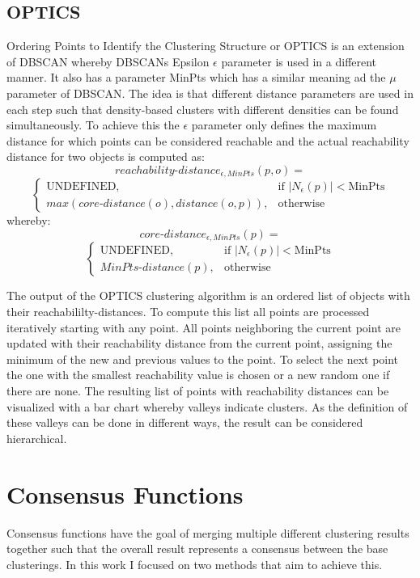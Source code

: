 \documentclass[
	a4paper,
	english,
	twoside,
	openright,               
	11pt                            
	]{report}
\begin{document}
\subsection{OPTICS}\label{sec:opticstheory}
Ordering Points to Identify the Clustering Structure or OPTICS \cite{10.1145/304181.304187} is an extension of DBSCAN whereby DBSCANs Epsilon $\epsilon$ parameter is used in a different manner. It also has a parameter MinPts which has a similar meaning ad the $\mu$ parameter of DBSCAN. The idea is that different distance parameters are used in each step such that density-based clusters with different densities can be found simultaneously. To achieve this the  $\epsilon$ parameter only defines the maximum distance for which points can be considered reachable and the actual reachability distance for two objects is computed as:
$$reachability\text{-}distance_{\epsilon,MinPts}(p,o)=$$
$$
\begin{cases}
    \text{UNDEFINED},& \text{if } |N_\epsilon(p)|< \text{MinPts}\\
    max(core\text{-}distance(o),distance(o,p)),              & \text{otherwise}
\end{cases}
$$
whereby:
$$core\text{-}distance_{\epsilon,MinPts}(p)=$$
$$
\begin{cases}
    \text{UNDEFINED},& \text{if } |N_\epsilon(p)|< \text{MinPts}\\
    MinPts\text{-}distance(p),              & \text{otherwise}
\end{cases}
$$

The output of the OPTICS clustering algorithm is an ordered list of objects with their reachabililty-distances. To compute this list all points are processed iteratively starting with any point. All points neighboring the current point are updated with their reachability distance from the current point, assigning the minimum of the new and previous values to the point. To select the next point the one with the smallest reachability value is chosen or a new random one if there are none. The resulting list of points with reachability distances can be visualized with a bar chart whereby valleys indicate clusters. As the definition of these valleys can be done in different ways, the result can be considered hierarchical.


\section{Consensus Functions}
Consensus functions have the goal of merging multiple different clustering results together such that the overall result represents a consensus between the base clusterings. In this work I focused on two methods that aim to achieve this.
\end{document}
